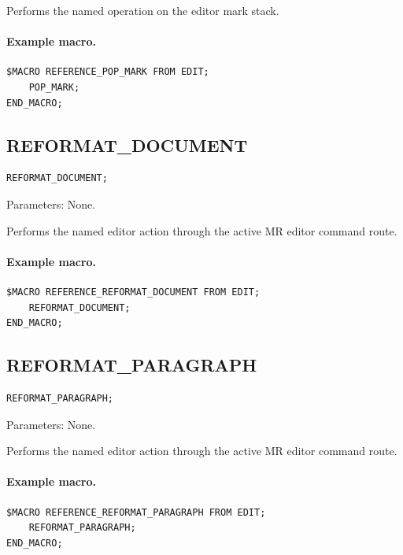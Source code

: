 \documentclass[a4paper,10pt,twoside,openany]{book}
\newenvironment{mrmacextension}{\begin{changebar}}{\end{changebar}}
\begin{document}
Performs the named operation on the editor mark stack.

\paragraph{Example macro.}
\begin{verbatim}
$MACRO REFERENCE_POP_MARK FROM EDIT;
    POP_MARK;
END_MACRO;
\end{verbatim}

\begin{mrmacextension}
\label{prim:procedure-reformat-document}
\subsection*{REFORMAT\_DOCUMENT}
\begin{verbatim}
REFORMAT_DOCUMENT;
\end{verbatim}
Parameters: None.

Performs the named editor action through the active MR editor command route.

\paragraph{Example macro.}
\begin{verbatim}
$MACRO REFERENCE_REFORMAT_DOCUMENT FROM EDIT;
    REFORMAT_DOCUMENT;
END_MACRO;
\end{verbatim}
\end{mrmacextension}

\begin{mrmacextension}
\label{prim:procedure-reformat-paragraph}
\subsection*{REFORMAT\_PARAGRAPH}
\begin{verbatim}
REFORMAT_PARAGRAPH;
\end{verbatim}
Parameters: None.

Performs the named editor action through the active MR editor command route.

\paragraph{Example macro.}
\begin{verbatim}
$MACRO REFERENCE_REFORMAT_PARAGRAPH FROM EDIT;
    REFORMAT_PARAGRAPH;
END_MACRO;
\end{verbatim}
\end{mrmacextension}
\end{document}
